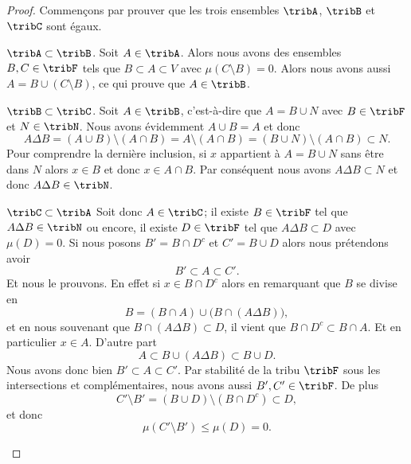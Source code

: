 \begin{proof}
    Commençons par prouver que les trois ensembles \( \tribA\), \( \tribB\) et \( \tribC\) sont égaux.
    \begin{subproof}
    \item[\( \tribA\subset\tribB\).]
        Soit \( A\in\tribA\). Alors nous avons des ensembles \( B,C\in\tribF \) tels que \( B\subset A\subset V\) avec \( \mu(C\setminus B)=0\). Alors nous avons aussi \( A=B\cup(C\setminus B)\), ce qui prouve que \( A\in\tribB\).
    \item[\( \tribB\subset\tribC\).]
        Soit \( A\in\tribB\), c'est-à-dire que \( A=B\cup N\) avec \( B\in\tribF\) et \( N\in\tribN\). Nous avons évidemment \( A\cup B=A\) et donc
        \begin{equation}
            A\Delta B=(A\cup B)\setminus(A\cap B)=A\setminus(A\cap B)=(B\cup N)\setminus(A\cap B)\subset N.
        \end{equation}
        Pour comprendre la dernière inclusion, si \( x\) appartient à \( A=B\cup N\) sans être dans \( N\) alors \( x\in B\) et donc \( x\in A\cap B\). Par conséquent nous avons \( A\Delta B\subset N\) et donc \( A\Delta B\in\tribN\).
    \item[\( \tribC\subset\tribA\)]
        Soit donc \( A\in\tribC\); il existe \( B\in\tribF\) tel que \( A\Delta B\in\tribN\) ou encore, il existe \( D\in\tribF\) tel que \( A\Delta B\subset D\) avec \( \mu(D)=0\). Si nous posons \( B'=B\cap D^c\) et \( C'=B\cup D\) alors nous prétendons avoir
        \begin{equation}
            B'\subset A\subset C'.
        \end{equation}
        Et nous le prouvons. En effet si \( x\in B\cap D^c\) alors en remarquant que \( B\) se divise en
        \begin{equation}
            B=(B\cap A)\cup\big(B\cap (A\Delta B)\big),
        \end{equation}
        et en nous souvenant que \( B\cap (A\Delta B)\subset D\), il vient que \( B\cap D^c\subset B\cap A\). Et en particulier \( x\in A\). D'autre part
        \begin{equation}
            A\subset B\cup(A\Delta B)\subset B\cup D.
        \end{equation}
        Nous avons donc bien \( B'\subset A\subset C'\). Par stabilité de la tribu \( \tribF\) sous les intersections et complémentaires, nous avons aussi \( B',C'\in\tribF\). De plus
        \begin{equation}
            C'\setminus B'=(B\cup D)\setminus(B\cap D^c)\subset D,
        \end{equation}
         et donc
         \begin{equation}
             \mu(C'\setminus B')\leq \mu(D)=0.
         \end{equation}
    \end{subproof}


\end{proof}
